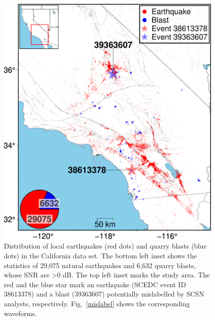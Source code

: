 \documentclass{gji}
\begin{document}
\begin{figure}
\centering
\includegraphics[width=.99\textwidth]{event.pdf}
\caption{Distribution of local earthquakes (red dots) and quarry blasts (blue dots) in the California data set. The bottom left inset shows the statistics of 29,075 natural earthquakes and 6,632 quarry blasts, whose SNR are \textgreater{0} dB. The top left inset marks the study area. The red and the blue star mark an earthquake (SCEDC event ID 38613378) and a blast (39363607) potentially mislabelled by SCSN analysts, respectively. Fig.~\ref{mislabel} shows the corresponding waveforms.}
\label{map}
\end{figure}
\end{document}
